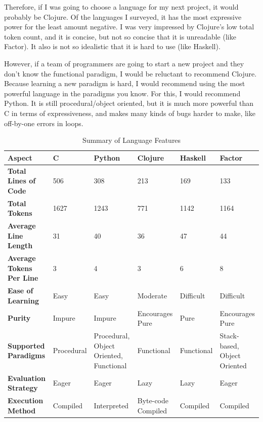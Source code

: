 \documentclass{article}
\begin{document}
Therefore, if I was going to choose a language for my next project, it would
probably be Clojure.  Of the languages I surveyed, it has the most expressive
power for the least amount negative.  I was very impressed by Clojure's low
total token count, and it is concise, but not so concise that it is unreadable
(like Factor).  It also is not so idealistic that it is hard to use (like
Haskell).

However, if a team of programmers are going to start a new project and they
don't know the functional paradigm, I would be reluctant to recommend Clojure.
Because learning a new paradigm is hard, I would recommend using the most
powerful language in the paradigms you know.  For this, I would recommend
Python.  It is still procedural/object oriented, but it is much more powerful
than C in terms of expressiveness, and makes many kinds of bugs harder to make,
like off-by-one errors in loops.

\begin{table}[h]
    \caption{Summary of Language Features}
    \begin{tabular}{|p{0.7in}|p{0.7in}|p{0.7in}|p{0.7in}|p{0.7in}|p{0.7in}|}
        \hline
        {\bf Aspect} & {\bf C} & {\bf Python} & {\bf Clojure} & {\bf Haskell} & {\bf Factor} \\
        \hline
        {\bf Total Lines of Code} & 506 & 308 & 213 & 169 & 133 \\
        \hline
        {\bf Total Tokens} & 1627 & 1243 & 771 & 1142 & 1164 \\
        \hline
        {\bf Average Line Length} & 31 & 40 & 36 & 47 & 44 \\
        \hline
        {\bf Average Tokens Per Line} & 3 & 4 & 3 & 6 & 8 \\
        \hline
        {\bf Ease of Learning} & Easy & Easy & Moderate & Difficult & Difficult \\
        \hline
        {\bf Purity} & Impure & Impure & Encourages Pure & Pure & Encourages Pure \\
        \hline
        {\bf Supported Paradigms} & Procedural & Procedural, Object Oriented, Functional & Functional & Functional & Stack-based, Object Oriented \\
        \hline
        {\bf Evaluation Strategy} & Eager & Eager & Lazy & Lazy & Eager \\
        \hline
        {\bf Execution Method} & Compiled & Interpreted & Byte-code Compiled & Compiled & Compiled \\
        \hline
    \end{tabular}
\end{table}
\end{document}
